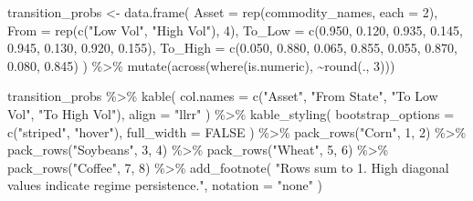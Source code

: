 \documentclass[
  10pt,
  a4paper,
]{article}
\newenvironment{Shaded}{\begin{snugshade}}{\end{snugshade}}
\newcommand{\AttributeTok}[1]{\textcolor[rgb]{0.40,0.45,0.13}{#1}}
\newcommand{\ConstantTok}[1]{\textcolor[rgb]{0.56,0.35,0.01}{#1}}
\newcommand{\DecValTok}[1]{\textcolor[rgb]{0.68,0.00,0.00}{#1}}
\newcommand{\FloatTok}[1]{\textcolor[rgb]{0.68,0.00,0.00}{#1}}
\newcommand{\FunctionTok}[1]{\textcolor[rgb]{0.28,0.35,0.67}{#1}}
\newcommand{\NormalTok}[1]{\textcolor[rgb]{0.00,0.23,0.31}{#1}}
\newcommand{\OtherTok}[1]{\textcolor[rgb]{0.00,0.23,0.31}{#1}}
\newcommand{\SpecialCharTok}[1]{\textcolor[rgb]{0.37,0.37,0.37}{#1}}
\newcommand{\StringTok}[1]{\textcolor[rgb]{0.13,0.47,0.30}{#1}}
\begin{document}
\begin{Shaded}
\begin{Highlighting}[]
\NormalTok{transition\_probs }\OtherTok{\textless{}{-}} \FunctionTok{data.frame}\NormalTok{(}
  \AttributeTok{Asset =} \FunctionTok{rep}\NormalTok{(commodity\_names, }\AttributeTok{each =} \DecValTok{2}\NormalTok{),}
  \AttributeTok{From =} \FunctionTok{rep}\NormalTok{(}\FunctionTok{c}\NormalTok{(}\StringTok{"Low Vol"}\NormalTok{, }\StringTok{"High Vol"}\NormalTok{), }\DecValTok{4}\NormalTok{),}
  \AttributeTok{To\_Low =} \FunctionTok{c}\NormalTok{(}\FloatTok{0.950}\NormalTok{, }\FloatTok{0.120}\NormalTok{, }\FloatTok{0.935}\NormalTok{, }\FloatTok{0.145}\NormalTok{, }\FloatTok{0.945}\NormalTok{, }\FloatTok{0.130}\NormalTok{, }\FloatTok{0.920}\NormalTok{, }\FloatTok{0.155}\NormalTok{),}
  \AttributeTok{To\_High =} \FunctionTok{c}\NormalTok{(}\FloatTok{0.050}\NormalTok{, }\FloatTok{0.880}\NormalTok{, }\FloatTok{0.065}\NormalTok{, }\FloatTok{0.855}\NormalTok{, }\FloatTok{0.055}\NormalTok{, }\FloatTok{0.870}\NormalTok{, }\FloatTok{0.080}\NormalTok{, }\FloatTok{0.845}\NormalTok{)}
\NormalTok{) }\SpecialCharTok{\%\textgreater{}\%}
  \FunctionTok{mutate}\NormalTok{(}\FunctionTok{across}\NormalTok{(}\FunctionTok{where}\NormalTok{(is.numeric), }\SpecialCharTok{\textasciitilde{}}\FunctionTok{round}\NormalTok{(., }\DecValTok{3}\NormalTok{)))}

\NormalTok{transition\_probs }\SpecialCharTok{\%\textgreater{}\%}
  \FunctionTok{kable}\NormalTok{(}
    \AttributeTok{col.names =} \FunctionTok{c}\NormalTok{(}\StringTok{"Asset"}\NormalTok{, }\StringTok{"From State"}\NormalTok{, }\StringTok{"To Low Vol"}\NormalTok{, }\StringTok{"To High Vol"}\NormalTok{),}
    \AttributeTok{align =} \StringTok{"llrr"}
\NormalTok{  ) }\SpecialCharTok{\%\textgreater{}\%}
  \FunctionTok{kable\_styling}\NormalTok{(}
    \AttributeTok{bootstrap\_options =} \FunctionTok{c}\NormalTok{(}\StringTok{"striped"}\NormalTok{, }\StringTok{"hover"}\NormalTok{),}
    \AttributeTok{full\_width =} \ConstantTok{FALSE}
\NormalTok{  ) }\SpecialCharTok{\%\textgreater{}\%}
  \FunctionTok{pack\_rows}\NormalTok{(}\StringTok{"Corn"}\NormalTok{, }\DecValTok{1}\NormalTok{, }\DecValTok{2}\NormalTok{) }\SpecialCharTok{\%\textgreater{}\%}
  \FunctionTok{pack\_rows}\NormalTok{(}\StringTok{"Soybeans"}\NormalTok{, }\DecValTok{3}\NormalTok{, }\DecValTok{4}\NormalTok{) }\SpecialCharTok{\%\textgreater{}\%}
  \FunctionTok{pack\_rows}\NormalTok{(}\StringTok{"Wheat"}\NormalTok{, }\DecValTok{5}\NormalTok{, }\DecValTok{6}\NormalTok{) }\SpecialCharTok{\%\textgreater{}\%}
  \FunctionTok{pack\_rows}\NormalTok{(}\StringTok{"Coffee"}\NormalTok{, }\DecValTok{7}\NormalTok{, }\DecValTok{8}\NormalTok{) }\SpecialCharTok{\%\textgreater{}\%}
  \FunctionTok{add\_footnote}\NormalTok{(}
    \StringTok{"Rows sum to 1. High diagonal values indicate regime persistence."}\NormalTok{,}
    \AttributeTok{notation =} \StringTok{"none"}
\NormalTok{  )}
\end{Highlighting}
\end{Shaded}
\end{document}
